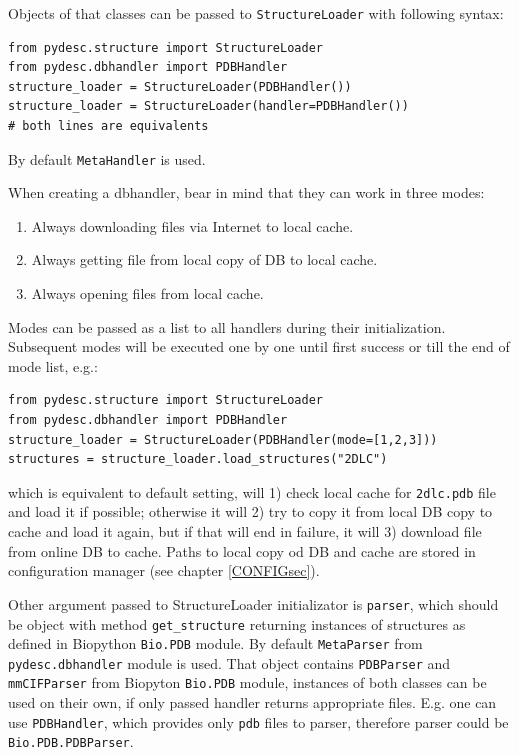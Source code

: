 \documentclass{article}
\begin{document}
Objects of that classes can be passed to \texttt{StructureLoader} with following syntax:

\begin{lstlisting}
from pydesc.structure import StructureLoader
from pydesc.dbhandler import PDBHandler
structure_loader = StructureLoader(PDBHandler())
structure_loader = StructureLoader(handler=PDBHandler())
# both lines are equivalents
\end{lstlisting}

    By default \texttt{MetaHandler} is used.
    
    When creating a dbhandler, bear in mind that they can work in three modes:
    \begin{enumerate}
        \item Always downloading files via Internet to local cache.
        \item Always getting file from local copy of DB to local cache.
        \item Always opening files from local cache.
    \end{enumerate}

    Modes can be passed as a list to all handlers during their initialization. Subsequent modes will be executed one by one until first success or till the end of mode list, e.g.:

\begin{lstlisting}
from pydesc.structure import StructureLoader
from pydesc.dbhandler import PDBHandler
structure_loader = StructureLoader(PDBHandler(mode=[1,2,3]))
structures = structure_loader.load_structures("2DLC")
\end{lstlisting}
    
    which is equivalent to default setting, will 1) check local cache for \texttt{2dlc.pdb} file and load it if possible; otherwise it will 2) try to copy it from local DB copy to cache and load it again, but if that will end in failure, it will 3) download file from online DB to cache. Paths to local copy od DB and cache are stored in configuration manager (see chapter \ref{CONFIGsec}).

    Other argument passed to StructureLoader initializator is \texttt{parser}, which should be object with method \texttt{get\_{}structure} returning instances of structures as defined in Biopython \texttt{Bio.PDB} module. By default \texttt{MetaParser} from \texttt{pydesc.dbhandler} module is used. That object contains \texttt{PDBParser} and \texttt{mmCIFParser} from Biopyton \texttt{Bio.PDB} module, instances of both classes can be used on their own, if only passed handler returns appropriate files. E.g. one can use \texttt{PDBHandler}, which provides only \texttt{pdb} files to parser, therefore parser could be \texttt{Bio.PDB.PDBParser}.
\end{document}
